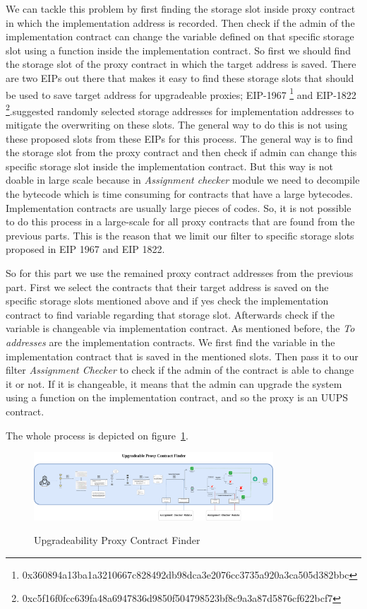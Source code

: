 We can tackle this problem by first finding the storage slot inside proxy contract in which the implementation address is recorded. Then check if the admin of the implementation contract can change the variable defined on that specific storage slot using a function inside the implementation contract. So first we should find the storage slot of the proxy contract in which the target address is saved. There are two EIPs out there that makes it easy to find these storage slots that should be used  to save target address for upgradeable proxies; EIP-1967 \footnote{0x360894a13ba1a3210667c828492db98dca3e2076cc3735a920a3ca505d382bbc} and EIP-1822 \footnote{0xc5f16f0fcc639fa48a6947836d9850f504798523bf8c9a3a87d5876cf622bcf7}.suggested randomly selected storage addresses for implementation addresses to mitigate the overwriting on these slots. The general way to do this is not using these proposed slots from these EIPs for this process. The general way is to find the storage slot from the proxy contract and then check if admin can change this specific storage slot inside the implementation contract. But this way is not doable in large scale because in \textit{Assignment checker} module we need to decompile the bytecode which is time consuming for contracts that have a large bytecodes. Implementation contracts are usually large pieces of codes. So, it is not possible to do this process in a large-scale for all proxy contracts that are found from the previous parts. This is the reason that we limit our filter to specific storage slots proposed in EIP 1967 and EIP 1822.

So for this part we use the remained proxy contract addresses from the previous part. First we select the contracts that their target address is saved on the specific storage slots mentioned above and if yes check the implementation contract to find variable regarding that storage slot. Afterwards check if the variable is changeable via implementation contract. As mentioned before, the \textit{To addresses} are the implementation contracts. We first find the variable in the implementation contract that is saved in the mentioned slots. Then pass it to our filter \textit{Assignment Checker} to check if the admin of the contract is able to change it or not. If it is changeable, it means that the admin can upgrade the system using a function on the implementation contract, and so the proxy is an UUPS contract. 

The whole process is depicted on figure~\ref{fig:finderModule}.

\begin{figure}[t]
  \includegraphics[width=0.8\textwidth]{figures/Upgradeability_finder1.png}\label{fig:finderModule}
  \caption{Upgradeability Proxy Contract Finder}
\end{figure}

